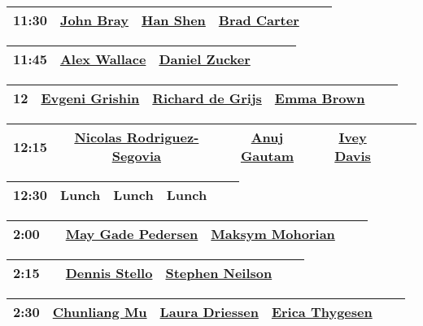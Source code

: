 \documentclass{article}
\begin{document}
\begin{longtable}{|c | c | c | c | c | c|}
\hline
11:30 & \href{speakers/john-bray/_index.md}{John Bray} & \href{speakers/han-shen/_index.md}{Han Shen} & \href{speakers/brad-carter/_index.md}{Brad Carter} \\
\hline
\end{longtable}
\begin{longtable}{|c | c | c | c | c | c|}
\hline
11:45 & \href{speakers/alex-wallace/_index.md}{Alex Wallace} & \href{speakers/daniel-zucker/_index.md}{Daniel Zucker} &  \\
\hline
\end{longtable}
\begin{longtable}{|c | c | c | c | c | c|}
\hline
12 & \href{speakers/evgeni-grishin/_index.md}{Evgeni Grishin} & \href{speakers/richard-de-grijs/_index.md}{Richard de Grijs} & \href{speakers/emma-brown/_index.md}{Emma Brown} \\
\hline
\end{longtable}
\begin{longtable}{|c | c | c | c | c | c|}
\hline
12:15 & \href{speakers/nicolas-rodriguez-segovia/_index.md}{Nicolas Rodriguez-Segovia} & \href{speakers/anuj-gautam/_index.md}{Anuj Gautam} & \href{speakers/ivey-davis/_index.md}{Ivey Davis} \\
\hline
\end{longtable}
\begin{longtable}{|c | c | c | c | c | c|}
\hline
12:30 & Lunch & Lunch & Lunch \\
\hline
\end{longtable}
\begin{longtable}{|c | c | c | c | c | c|}
\hline
2:00 &  & \href{speakers/may-gade-pedersen/_index.md}{May Gade Pedersen} & \href{speakers/maksym-mohorian/_index.md}{Maksym Mohorian} \\
\hline
\end{longtable}
\begin{longtable}{|c | c | c | c | c | c|}
\hline
2:15 &  & \href{speakers/dennis-stello/_index.md}{Dennis Stello} & \href{speakers/stephen-neilson/_index.md}{Stephen Neilson} \\
\hline
\end{longtable}
\begin{longtable}{|c | c | c | c | c | c|}
\hline
2:30 & \href{speakers/chunliang-mu/_index.md}{Chunliang Mu} & \href{speakers/laura-driessen/_index.md}{Laura Driessen} & \href{speakers/erica-thygesen/_index.md}{Erica Thygesen} \\
\hline
\end{longtable}
\end{document}
